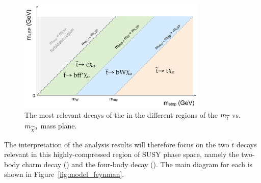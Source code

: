 \begin{figure}[h!]
  \centering
  \includegraphics[width=0.8\textwidth]{Figs/sms/stop_mass_plane.png}
  \caption{The most relevant decays of the \sTop in the different \deltam regions of
  the $m_{\widetilde{t}}$ vs. $m_{\widetilde{\chi}^{0}}$ mass plane.}
  \label{fig:stop_mass_plane}
\end{figure}

The interpretation of the analysis results will therefore focus on the two $\tilde{t}$
decays relevant in
this highly-compressed region of SUSY phase space, namely the two-body charm decay
(\Ttwocc) and the four-body decay (\Ttwodegen). The main diagram
for each is shown in Figure~\ref{fig:model_feynman}.

